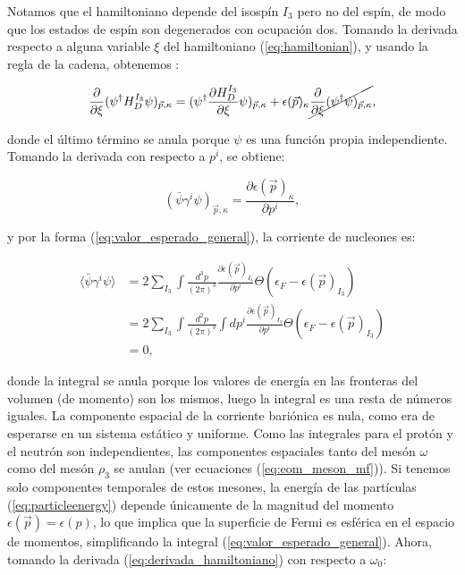 Notamos que el hamiltoniano depende del isospín $I_3$ pero no del espín, de modo que los estados de espín son degenerados con ocupación dos. Tomando la derivada respecto a alguna variable $\xi$ del hamiltoniano (\ref{eq:hamiltonian}), y usando la regla de la cadena, obtenemos \cite{glendenningCompactStarsNuclear2000}:

\begin{equation}
	\begin{aligned}
		\frac{\partial}{\partial \xi} (\psi^\dagger H_D^{I_3} \psi)_{\Vec{p},\kappa} = (\psi^\dagger \frac{\partial H_D^{I_3}}{\partial \xi} \psi)_{\Vec{p},\kappa} + \epsilon(\Vec{p})_\kappa \cancel{\frac{\partial}{\partial \xi} (\psi^\dagger \psi)_{\Vec{p},\kappa}}, \\
	\end{aligned}
	\label{eq:derivada_hamiltoniano}
\end{equation}

donde el último término se anula porque $\psi$ es una función propia independiente. Tomando la derivada con respecto a $p^i$, se obtiene:

\begin{equation*}
	(\bar{\psi} \gamma^i \psi)_{\Vec{p},\kappa} = \frac{\partial \epsilon(\Vec{p})_\kappa}{\partial p^i},
\end{equation*}

y por la forma (\ref{eq:valor_esperado_general}), la corriente de nucleones es:

\begin{equation}
	\begin{aligned}
		\langle \bar{\psi} \gamma^i \psi \rangle &= 2\sum_{I_3}\int \frac{d^3p}{(2\pi)^3} \frac{\partial \epsilon(\Vec{p})_{I_3}}{\partial p^i} \Theta(\epsilon_F - \epsilon(\Vec{p})_{I_3}) \\
												 &= 2\sum_{I_3}\int \frac{d^2p}{(2\pi)^3} \int dp^i \frac{\partial \epsilon(\Vec{p})_{I_3}}{\partial p^i} \Theta(\epsilon_F - \epsilon(\Vec{p})_{I_3}) \\
												 &= 0,
		\label{eq:corriente_barionica_espacial}
	\end{aligned}		
\end{equation}

donde la integral se anula porque los valores de energía en las fronteras del volumen (de momento) son los mismos, luego la integral es una resta de números iguales. La componente espacial de la corriente bariónica es nula, como era de esperarse en un sistema estático y uniforme. Como las integrales para el protón y el neutrón son independientes, las componentes espaciales tanto del mesón $\omega$ como del mesón $\rho_3$ se anulan (ver ecuaciones (\ref{eq:eom_meson_mf})). Si tenemos solo componentes temporales de estos mesones, la energía de las partículas (\ref{eq:particleenergy}) depende únicamente de la magnitud del momento $\epsilon(\Vec{p}) = \epsilon(p)$, lo que implica que la superficie de Fermi es esférica en el espacio de momentos, simplificando la integral (\ref{eq:valor_esperado_general}). Ahora, tomando la derivada (\ref{eq:derivada_hamiltoniano}) con respecto a $\omega_0$:

